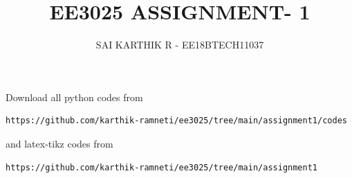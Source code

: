\documentclass[journal,12pt,twocolumn]{IEEEtran}
\begin{document}
     \def\rightbox#1{\makebox[0in][r]{#1}}
     \def\centbox#1{\makebox[0in]{#1}}
     \def\topbox#1{\raisebox{-\baselineskip}[0in][0in]{#1}}
     \def\midbox#1{\raisebox{-0.5\baselineskip}[0in][0in]{#1}}
\vspace{3cm}
\title{EE3025 ASSIGNMENT- 1}
\author{SAI KARTHIK R - EE18BTECH11037}
\maketitle
\newpage
\bigskip
\renewcommand{\thefigure}{\theenumi}
\renewcommand{\thetable}{\theenumi}
Download all python codes from 
\begin{lstlisting}
https://github.com/karthik-ramneti/ee3025/tree/main/assignment1/codes
\end{lstlisting}
%
and latex-tikz codes from 
%
\begin{lstlisting}
https://github.com/karthik-ramneti/ee3025/tree/main/assignment1
\end{lstlisting}
\end{document}
